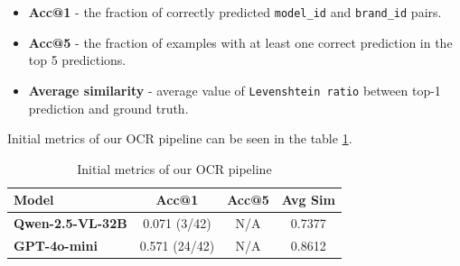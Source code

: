 \documentclass{article}
\begin{document}
\begin{itemize}
    \item \textbf{Acc@1} - the fraction of correctly predicted \texttt{model\_id} and \texttt{brand\_id} pairs.
    \item \textbf{Acc@5} - the fraction of examples with at least one correct prediction in the top 5 predictions.
    \item \textbf{Average similarity} - average value of \texttt{Levenshtein ratio} between top-1 prediction and ground truth.
\end{itemize}

Initial metrics of our OCR pipeline can be seen in the table \ref{tab:initial_metrics}.

\begin{table}[h]
    \centering
    \begin{tabular}{|l|c|c|c|}
        \hline
        \textbf{Model} & \textbf{Acc@1} & \textbf{Acc@5} & \textbf{Avg Sim} \\
        \hline
        \textbf{Qwen-2.5-VL-32B} & 0.071 (3/42) & N/A & 0.7377 \\
        \hline
        \textbf{GPT-4o-mini} & 0.571 (24/42) & N/A & 0.8612 \\
        \hline
    \end{tabular}
    \caption{Initial metrics of our OCR pipeline}
    \label{tab:initial_metrics}
\end{table}
\end{document}
